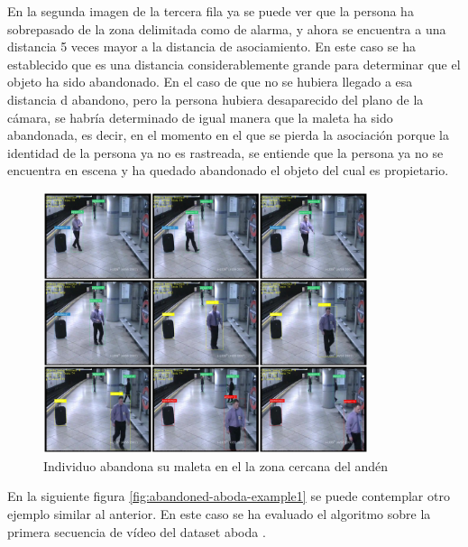 En la segunda imagen de la tercera fila ya se puede ver que la persona ha sobrepasado de la zona delimitada como de alarma, y ahora se encuentra a una distancia 5 veces mayor a la distancia de asociamiento. En este caso se ha establecido que es una distancia considerablemente grande para determinar que el objeto ha sido abandonado. En el caso de que no se hubiera llegado a esa distancia d abandono, pero la persona hubiera desaparecido del plano de la cámara, se habría determinado de igual manera que la maleta ha sido abandonada, es decir, en el momento en el que se pierda la asociación porque la identidad de la persona ya no es rastreada, se entiende que la persona ya no se encuentra en escena y ha quedado abandonado el objeto del cual es propietario.

\begin{figure}[ht]
\centering
\includegraphics[width=0.85\textwidth]{img/chapters/resultados/abandono/abandoned-avssab2007-example2.png}
\caption{\label{fig:abandoned-avssab2007-example2}Individuo abandona su maleta en el la zona cercana del andén \cite{AVSSAB2007-dataset}}
\end{figure}

En la siguiente figura \ref{fig:abandoned-aboda-example1} se puede contemplar otro ejemplo similar al anterior. En este caso se ha evaluado el algoritmo sobre la primera secuencia de vídeo del dataset \gls{aboda} \cite{aboda-dataset}.

